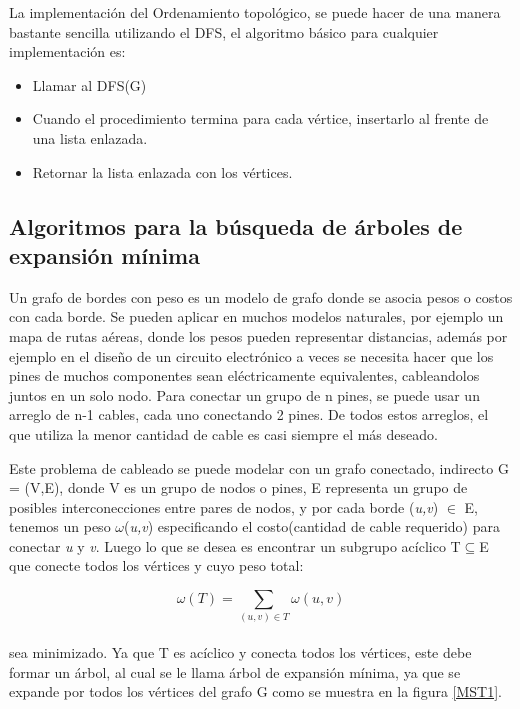\documentclass[a4paper, 11pt]{report}
\begin{document}
La implementaci\'on del Ordenamiento topol\'ogico, se puede hacer de una manera bastante sencilla utilizando el DFS, el algoritmo b\'asico para cualquier implementaci\'on es:

\begin{itemize}
    \item Llamar al DFS(G)
    \item Cuando el procedimiento termina para cada v\'ertice, insertarlo al frente de una lista enlazada.
    \item Retornar la lista enlazada con los v\'ertices.
\end{itemize} 

\subsection{Algoritmos para la b\'usqueda de \'arboles de expansi\'on m\'inima}
Un grafo de bordes con peso es un modelo de grafo donde se asocia pesos o costos con cada borde. Se pueden aplicar en muchos modelos naturales, por ejemplo un mapa de rutas aéreas, donde los pesos pueden representar distancias, además por ejemplo en el diseño de un circuito electrónico a veces se necesita hacer que los pines de muchos componentes sean eléctricamente equivalentes, cableandolos juntos en un solo nodo. Para conectar un grupo de n pines, se puede usar un arreglo de n-1 cables, cada uno conectando 2 pines. De todos estos arreglos, el que utiliza la menor cantidad de cable es casi siempre el más deseado. 

Este problema de cableado se puede modelar con un grafo conectado, indirecto G = (V,E), donde V es un grupo de nodos o pines, E representa un grupo de posibles interconecciones entre pares de nodos, y por cada borde (\textit{u,v}) $\in$  E, tenemos un peso $\omega$(\textit{u,v}) especificando el costo(cantidad de cable requerido) para conectar \textit{u} y \textit{v}. Luego lo que se desea es encontrar un subgrupo acíclico T$ \subseteq $E que conecte todos los vértices y cuyo peso total:

\begin{equation}
 \omega (T) =  \sum_{(u,v) \in T}  \omega (u,v) 
\end{equation}
\\
sea minimizado. Ya que T es acíclico y conecta todos los vértices, este debe formar un árbol, al cual se le llama árbol de expansión mínima, ya que se expande por todos los vértices del grafo G como se muestra en la figura \ref{MST1}. 
\end{document}
